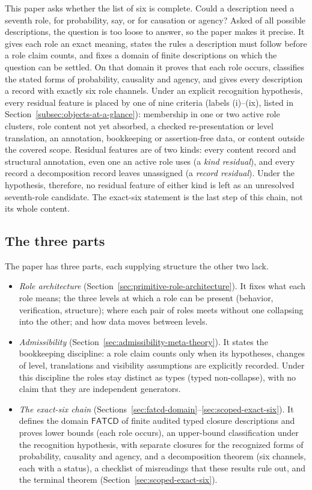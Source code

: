 \documentclass[11pt]{article}
\theoremstyle{definition}
\newcommand{\FATCD}{\ensuremath{\mathsf{FATCD}}}
\begin{document}
This paper asks whether the list of six is complete. Could a
description need a seventh role, for probability, say, or for causation
or agency? Asked of all possible descriptions, the question is too
loose to answer, so the paper makes it precise. It gives each role an
exact meaning, states the rules a description must follow before a
role claim counts, and fixes a domain of finite descriptions on which
the question can be settled. On that domain it proves that each role
occurs, classifies the stated forms of probability, causality and
agency, and gives every description a record with exactly six role
channels. Under an explicit recognition hypothesis, every residual feature is placed by
one of nine criteria (labels (i)--(ix), listed in
Section~\ref{subsec:objects-at-a-glance}): membership in one or two active role clusters,
role content not yet absorbed, a checked re-presentation or level translation, an annotation,
bookkeeping or assertion-free data, or content outside the covered
scope. Residual features are of two kinds: every content record and
structural annotation, even one an active role uses (a \emph{kind residual}),
and every record a decomposition record leaves unassigned (a \emph{record
residual}). Under the hypothesis, therefore, no residual feature of either kind is left as
an unresolved seventh-role candidate. The exact-six statement is the
last step of this chain, not its whole content.

\subsection{The three parts}\label{subsec:three-pillars}

The paper has three parts, each supplying structure the other two lack.
\begin{itemize}[topsep=2pt,itemsep=2pt]
  \item \emph{Role architecture}
    (Section~\ref{sec:primitive-role-architecture}). It fixes what each
    role means; the three levels at which a role can be present
    (behavior, verification, structure); where each pair of roles meets
    without one collapsing into the other; and how data moves between
    levels.
  \item \emph{Admissibility}
    (Section~\ref{sec:admissibility-meta-theory}). It states the
    bookkeeping discipline: a role claim counts only when its
    hypotheses, changes of level, translations and visibility
    assumptions are explicitly recorded. Under this discipline the roles
    stay distinct as types (typed non-collapse), with no claim that they
    are independent generators.
  \item \emph{The exact-six chain}
    (Sections~\ref{sec:fatcd-domain}--\ref{sec:scoped-exact-six}). It
    defines the domain \FATCD{} of finite audited typed closure
    descriptions and proves lower bounds (each role occurs), an
    upper-bound classification under the recognition hypothesis, with
    separate closures for the recognized forms of probability, causality
    and agency, and a decomposition theorem (six channels, each with a
    status), a checklist of misreadings that these results rule out, and
    the terminal theorem (Section~\ref{sec:scoped-exact-six}).
\end{itemize}
\end{document}
